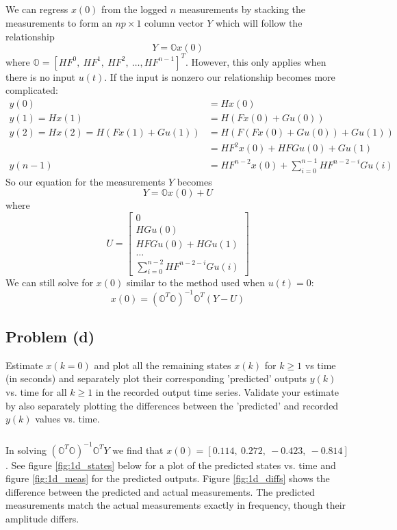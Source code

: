 \documentclass[11pt]{article}
\begin{document}
\subparagraph*{}
We can regress $x(0)$ from the logged $n$ measurements by stacking the measurements to form an $np\times1$ column vector $Y$ which will follow the relationship
\begin{equation*}
	Y = \mathbb{O}x(0)
\end{equation*}
where $\mathbb{O}=[HF^0,\ HF^1,\ HF^2,\ \dots, HF^{n-1}]^T$. However, this only applies when there is no input $u(t)$. If the input is nonzero our relationship becomes more complicated:
\begin{align*}
	y(0) &= Hx(0) \\
	y(1) = Hx(1) &= H(Fx(0) + Gu(0)) \\
	y(2) = Hx(2) = H(Fx(1) + Gu(1)) &= H(F(Fx(0) + Gu(0)) + Gu(1)) \\
	&= HF^2x(0) + HFGu(0) + Gu(1) \\
	y(n-1) &= HF^{n-2}x(0) + \sum_{i=0}^{n-1}HF^{n-2-i}Gu(i)
\end{align*}
So our equation for the measurements $Y$ becomes
\begin{equation*}
	Y = \mathbb{O}x(0) + U
\end{equation*}
where
\begin{equation*}
	U=\begin{bmatrix} 0 \\ HGu(0) \\ HFGu(0) + HGu(1) \\ \dots \\ \sum_{i=0}^{n-2}HF^{n-2-i}Gu(i) \end{bmatrix}
\end{equation*}
We can still solve for $x(0)$ similar to the method used when $u(t)=0$:
\begin{equation*}
	x(0) = (\mathbb{O}^T\mathbb{O})^{-1}\mathbb{O}^T(Y-U)
\end{equation*}

\subsection*{Problem (d)}
Estimate $x(k=0)$ and plot all the remaining states $x(k)$ for $k\geq 1$ vs time (in seconds) and separately plot their corresponding 'predicted' outputs $y(k)$ vs. time for all $k\geq 1$ in the recorded output time series. Validate your estimate by also separately plotting the differences between the 'predicted' and recorded $y(k)$ values vs. time.

\subparagraph*{}
In solving $(\mathbb{O}^T\mathbb{O})^{-1}\mathbb{O}^TY$ we find that $x(0)=[0.114,\ 0.272,\ -0.423,\ -0.814]$. See figure \ref{fig:1d_states} below for a plot of the predicted states vs. time and figure \ref{fig:1d_meas} for the predicted outputs. Figure \ref{fig:1d_diffs} shows the difference between the predicted and actual measurements. The predicted measurements match the actual measurements exactly in frequency, though their amplitude differs.
\end{document}
